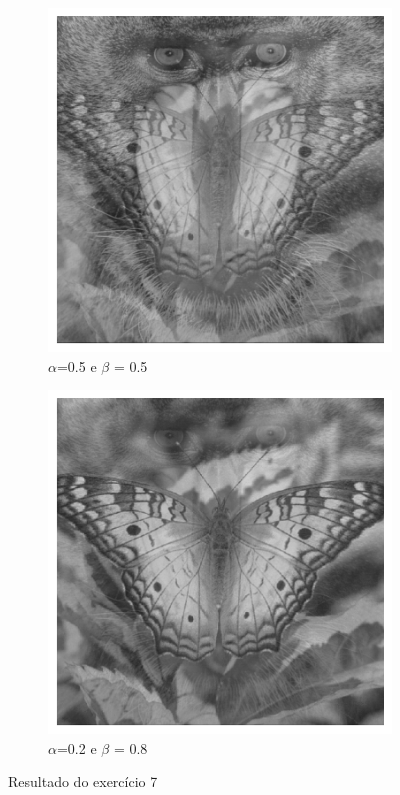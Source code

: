 \documentclass[12pt,a4paper]{report}
\begin{document}
\begin{figure}[H]
\begin{subfigure}[b]{0.32\textwidth}
        \includegraphics[width=\textwidth]{imagens/ex7-2.png}
        \caption{\(\alpha\)=0.5 e \(\beta\) = 0.5}
    \end{subfigure}
    \hfill
    \begin{subfigure}[b]{0.32\textwidth}
        \includegraphics[width=\textwidth]{imagens/ex7-3.png}
        \caption{\(\alpha\)=0.2 e \(\beta\) = 0.8}
    \end{subfigure}
    \caption{Resultado do exercício 7}
\end{figure}
\end{document}

